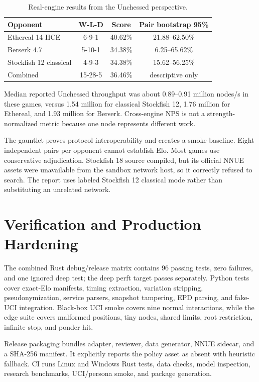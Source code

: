 \documentclass[conference]{IEEEtranSSP}
\begin{document}
\begin{table}[t]
\caption{Real-engine results from the Unchessed perspective.}
\label{tab:gauntlet}
\centering
\footnotesize
\begin{tabular}{|p{}|c|c|c|}
\hline
Opponent & W-L-D & Score & Pair bootstrap 95\% \\
\hline
Ethereal 14 HCE & 6-9-1 & 40.62\% & 21.88--62.50\% \\
Berserk 4.7 & 5-10-1 & 34.38\% & 6.25--65.62\% \\
Stockfish 12 classical & 4-9-3 & 34.38\% & 15.62--56.25\% \\
\hline
Combined & 15-28-5 & 36.46\% & descriptive only \\
\hline
\end{tabular}
\end{table}

Median reported Unchessed throughput was about 0.89--0.91 million nodes/s in these games, versus 1.54 million for classical Stockfish 12, 1.76 million for Ethereal, and 1.93 million for Berserk. Cross-engine NPS is not a strength-normalized metric because one node represents different work.

The gauntlet proves protocol interoperability and creates a smoke baseline. Eight independent pairs per opponent cannot establish Elo. Most games use conservative adjudication. Stockfish 18 source compiled, but its official NNUE assets were unavailable from the sandbox network host, so it correctly refused to search. The report uses labeled Stockfish 12 classical mode rather than substituting an unrelated network.

\section{Verification and Production Hardening}
The combined Rust debug/release matrix contains 96 passing tests, zero failures, and one ignored deep test; the deep perft target passes separately. Python tests cover exact-Elo manifests, timing extraction, variation stripping, pseudonymization, service parsers, snapshot tampering, EPD parsing, and fake-UCI integration. Black-box UCI smoke covers nine normal interactions, while the edge suite covers malformed positions, tiny nodes, shared limits, root restriction, infinite stop, and ponder hit.

Release packaging bundles adapter, reviewer, data generator, NNUE sidecar, and a SHA-256 manifest. It explicitly reports the policy asset as absent with heuristic fallback. CI runs Linux and Windows Rust tests, data checks, model inspection, research benchmarks, UCI/persona smoke, and package generation.
\end{document}
